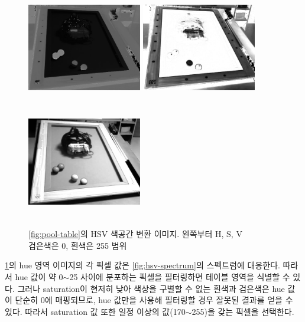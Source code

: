 \documentclass[11pt]{oblivoir}
\begin{document}
    \begin{figure}[ht]
        \begin{center}
            \includegraphics[width=5cm, height=5cm, keepaspectratio]{img/billiards-table-h-shift.png}
            \includegraphics[width=5cm, height=5cm, keepaspectratio]{img/billiards-table-s.png}
            \includegraphics[width=5cm, height=5cm, keepaspectratio]{img/billiards-table-v.png}
        \end{center}
        \caption[Caption for LOF]{\cref{fig;pool-table}의 HSV 색공간 변환 이미지. 왼쪽부터 H\footnotemark, S, V \\ 검은색은 0, 흰색은 255 범위}
        \label{fig;pool-table-hs}
    \end{figure}

    \cref{fig;pool-table-hs}의 hue 영역 이미지의 각 픽셀 값은 \cref{fig;hsv-spectrum}의 스펙트럼에 대응한다. 따라서 hue 값이 약 0$\sim$25 사이에 분포하는 픽셀을 필터링하면 테이블 영역을 식별할 수 있다. 그러나 saturation이 현저히 낮아 색상을 구별할 수 없는 흰색과 검은색은 hue 값이 단순히 0에 매핑되므로, hue 값만을 사용해 필터링할 경우 잘못된 결과를 얻을 수 있다. 따라서 saturation 값 또한 일정 이상의 값(170$\sim$255)을 갖는 픽셀을 선택한다.
\end{document}
